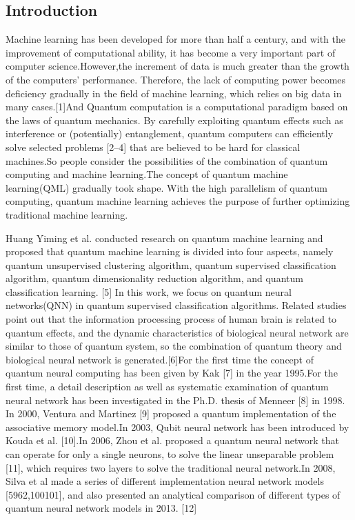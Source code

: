 \documentclass[a4paper,fleqn]{cas-dc}
\begin{document}
\begin{twocolumn}

\section{Introduction}
Machine learning has been developed for more than half a century, and with the improvement of computational ability, it has become a very important part of computer science.However,the increment of data is much greater than the growth of the computers' performance. Therefore, the lack of computing power becomes deficiency gradually in the field of machine learning, which relies on big data in many cases.[1]And Quantum computation is a computational paradigm based on the laws of quantum mechanics. By carefully exploiting quantum effects such as interference or (potentially) entanglement, quantum computers can efficiently solve selected problems [2–4] that are believed to be hard for classical machines.So people consider the possibilities of the combination of quantum computing and machine learning.The concept of quantum machine learning(QML) gradually took shape. With the high parallelism of quantum computing, quantum machine learning achieves the purpose of further optimizing traditional machine learning.

Huang Yiming et al. conducted research on quantum machine learning and proposed that quantum machine learning is divided into four aspects, namely quantum unsupervised clustering algorithm, quantum supervised classification algorithm, quantum dimensionality reduction algorithm, and quantum classification learning. [5] In this work, we focus on quantum neural networks(QNN) in quantum supervised classification algorithms. Related studies point out that the information processing process of human brain is related to quantum effects, and the dynamic characteristics of biological neural network are similar to those of quantum system, so the combination  of quantum theory and biological neural network is generated.[6]For the first time the concept of quantum neural computing has been given by Kak [7] in the year 1995.For the first time, a detail description as well as systematic examination of quantum neural network has been investigated in the Ph.D. thesis of Menneer [8] in 1998. In 2000, Ventura and Martinez [9] proposed a quantum implementation of the associative memory model.In 2003, Qubit neural network has been introduced by Kouda et al. [10].In 2006, Zhou et al. proposed a quantum neural network that can operate for only a single neurons, to solve the linear unseparable problem [11], which requires two layers to solve the traditional neural network.In 2008, Silva et al made a series of different implementation neural network models [5962,100101], and also presented an analytical comparison of different types of quantum neural network models in 2013. [12]


\end{twocolumn}
\end{document}

